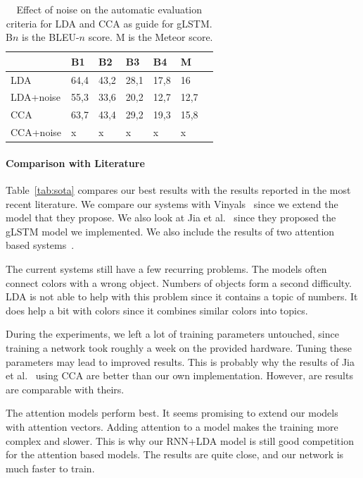\documentclass[twoside,twocolumn]{article}
\begin{document}
	\begin{table}
		\centering
		\begin{tabular}{lllllll}
			~                  & B1 & B2 & B3 & B4 & M \\ \hline
			LDA   & 64,4   & 43,2   & 28,1   & 17,8 & 16 \\
			LDA+noise   & 55,3   & 33,6   & 20,2   & 12,7 & 12,7 \\ \hline
			CCA   & 63,7   & 43,4   & 29,2   & 19,3 & 15,8 \\
			CCA+noise   & x  & x   & x   & x & x \\ \hline			
		\end{tabular}
		\caption{Effect of noise on the automatic evaluation criteria for LDA and CCA as guide for gLSTM. B$n$ is the BLEU-$n$ score. M is the Meteor score.}
		\label{table:noisy}
	\end{table}
	
	
	
	\paragraph{Comparison with Literature}
	Table~\ref{tab:sota} compares our best results with the results reported in the most recent literature. We compare our systems with Vinyals~\cite{Google} since we extend the model that they propose. We also look at Jia et al.~\cite{Fernando2015} since they proposed the gLSTM model we implemented. We also include the results of two attention based systems~\cite{Jin2015, Xu2015}. 
	
	The current systems still have a few recurring problems. The models often connect colors with a wrong object. Numbers of objects form a second difficulty. LDA is not able to help with this problem since it contains a topic of numbers. It does help a bit with colors since it combines similar colors into topics.
	
	During the experiments, we left a lot of training parameters untouched, since training a network took roughly a week on the provided hardware. Tuning these parameters may lead to improved results. This is probably why the results of Jia et al.~\cite{Fernando2015} using CCA are better than our own implementation. However, are results are comparable with theirs. 
	
	The attention models perform best. It seems promising to extend our models with attention vectors. Adding attention to a model makes the training more complex and slower. This is why our RNN+LDA model is still good competition for the attention based models. The results are quite close, and our network is much faster to train. 
	
\end{document}
